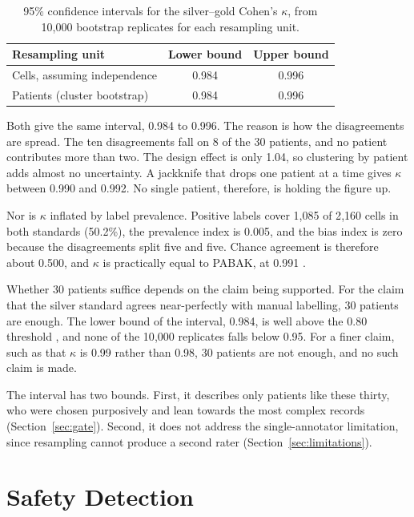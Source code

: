 \begin{table}[h]
\centering
\caption{95\% confidence intervals for the silver--gold Cohen's $\kappa$, from 10{,}000
bootstrap replicates for each resampling unit.}
\label{tab:kappa-ci}
\begin{tabular}{lcc}
\hline
\textbf{Resampling unit} & \textbf{Lower bound} & \textbf{Upper bound} \\
\hline
Cells, assuming independence & 0.984 & 0.996 \\
Patients (cluster bootstrap)  & 0.984 & 0.996 \\
\hline
\end{tabular}
\end{table}

Both give the same interval, 0.984 to 0.996. The reason is how the disagreements are spread.
The ten disagreements fall on 8 of the 30 patients, and no patient contributes more than two.
The design effect is only 1.04, so clustering by patient adds almost no uncertainty. A
jackknife that drops one patient at a time gives $\kappa$ between 0.990 and 0.992. No single
patient, therefore, is holding the figure up.

Nor is $\kappa$ inflated by label prevalence. Positive labels cover 1{,}085 of 2{,}160 cells in
both standards (50.2\%), the prevalence index is 0.005, and the bias index is zero because the
disagreements split five and five. Chance agreement is therefore about 0.500, and $\kappa$ is
practically equal to PABAK, at 0.991 \cite{byrt1993}.

Whether 30 patients suffice depends on the claim being supported. For the claim that the silver
standard agrees near-perfectly with manual labelling, 30 patients are enough. The lower bound of
the interval, 0.984, is well above the 0.80 threshold \cite{landis1977}, and none of the 10{,}000
replicates falls below 0.95. For a finer claim, such as that $\kappa$ is 0.99 rather than 0.98,
30 patients are not enough, and no such claim is made.

The interval has two bounds. First, it describes only patients like these thirty, who were
chosen purposively and lean towards the most complex records (Section~\ref{sec:gate}). Second,
it does not address the single-annotator limitation, since resampling cannot produce a second
rater (Section~\ref{sec:limitations}).

\section{Safety Detection}
\label{sec:safety-detection}


